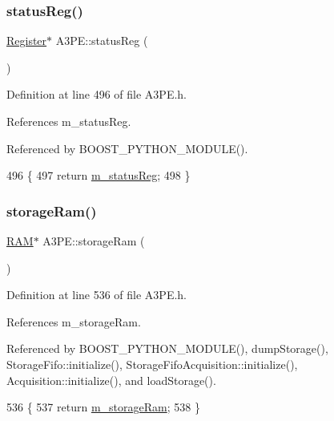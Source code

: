 \subsubsection{\texorpdfstring{status\+Reg()}{statusReg()}}
{\footnotesize\ttfamily \hyperlink{classRegister}{Register}$\ast$ A3\+P\+E\+::status\+Reg (\begin{DoxyParamCaption}{ }\end{DoxyParamCaption})\hspace{0.3cm}{\ttfamily [inline]}}



Definition at line 496 of file A3\+P\+E.\+h.



References m\+\_\+status\+Reg.



Referenced by B\+O\+O\+S\+T\+\_\+\+P\+Y\+T\+H\+O\+N\+\_\+\+M\+O\+D\+U\+L\+E().


\begin{DoxyCode}
496                        \{
497     \textcolor{keywordflow}{return} \hyperlink{classA3PE_a2281e3d12a2dffad99ec55be2b695f53}{m\_statusReg};
498   \}
\end{DoxyCode}
\mbox{\label{classA3PE_af241373059bad4a3c376ab2ac98a7b29}} 
\subsubsection{\texorpdfstring{storage\+Ram()}{storageRam()}}
{\footnotesize\ttfamily \hyperlink{classRAM}{R\+AM}$\ast$ A3\+P\+E\+::storage\+Ram (\begin{DoxyParamCaption}{ }\end{DoxyParamCaption})\hspace{0.3cm}{\ttfamily [inline]}}



Definition at line 536 of file A3\+P\+E.\+h.



References m\+\_\+storage\+Ram.



Referenced by B\+O\+O\+S\+T\+\_\+\+P\+Y\+T\+H\+O\+N\+\_\+\+M\+O\+D\+U\+L\+E(), dump\+Storage(), Storage\+Fifo\+::initialize(), Storage\+Fifo\+Acquisition\+::initialize(), Acquisition\+::initialize(), and load\+Storage().


\begin{DoxyCode}
536                    \{
537     \textcolor{keywordflow}{return} \hyperlink{classA3PE_a41e317474e0c6e63bad4648903279be9}{m\_storageRam};
538   \}
\end{DoxyCode}
\mbox{\label{classA3PE_a9327d0bd2efb5baa7c6b7de27bbc5997}} 
